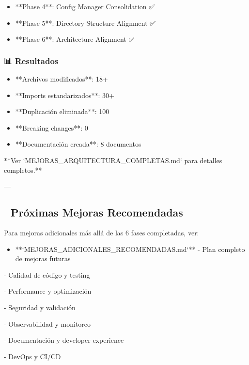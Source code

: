 \documentclass[11pt,a4paper]{article}
\begin{document}
\begin{itemize}
\item [x] **Phase 4**: Config Manager Consolidation ✅
\end{itemize}

\begin{itemize}
\item [x] **Phase 5**: Directory Structure Alignment ✅
\end{itemize}

\begin{itemize}
\item [x] **Phase 6**: Architecture Alignment ✅
\end{itemize}

\subsubsection{📊 Resultados}

\begin{itemize}
\item **Archivos modificados**: 18+
\end{itemize}

\begin{itemize}
\item **Imports estandarizados**: 30+
\end{itemize}

\begin{itemize}
\item **Duplicación eliminada**: 100%
\end{itemize}

\begin{itemize}
\item **Breaking changes**: 0
\end{itemize}

\begin{itemize}
\item **Documentación creada**: 8 documentos
\end{itemize}

**Ver `MEJORAS\_ARQUITECTURA\_COMPLETAS.md` para detalles completos.**

---

\subsection{🚀 Próximas Mejoras Recomendadas}

Para mejoras adicionales más allá de las 6 fases completadas, ver:

\begin{itemize}
\item **`MEJORAS_ADICIONALES_RECOMENDADAS.md`** - Plan completo de mejoras futuras
\end{itemize}

  - Calidad de código y testing

  - Performance y optimización

  - Seguridad y validación

  - Observabilidad y monitoreo

  - Documentación y developer experience

  - DevOps y CI/CD
\end{document}
